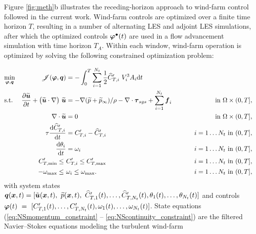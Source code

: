 \documentclass[a4paper]{jpconf}
\begin{document}
Figure \ref{fig:meth}b illustrates the receding-horizon approach to wind-farm control followed in the current work. Wind-farm controls
are optimized over a finite time horizon $T$, resulting in a number of alternating LES and adjoint LES simulations, after which the
optimized controls $\boldsymbol{\varphi}^{\bullet}(t)$ are used in a flow advancement simulation with time horizon $T_A$. Within each window, wind-farm
operation is optimized by solving the following constrained optimization problem:  

\begin{alignat}{4}
& \underset{\boldsymbol{\varphi}, \boldsymbol{q}}{\text{min}}  & \hspace*{25pt}  \mathscr{J}(\boldsymbol{\varphi}, \boldsymbol{q}) &= - \int_{0}^{T} \sum_{i=1}^{N_t} \frac{1}{2} \widehat{C}_{T,i}'~V_i^3 A_i \text{d}t  & \label{eq:costfunction}\\
& \text{s.t.}                      			&         \frac{\partial \widetilde{\boldsymbol{u}}}{\partial t} + \big(\widetilde{\boldsymbol{u}} \cdot \nabla \big)~ \widetilde{\boldsymbol{u}} &= - \nabla (\widetilde{p} + \widetilde{p}_\infty) / \rho - \nabla \cdot \boldsymbol{\tau}_{sgs} + \sum_{i=1}^{N_t} \boldsymbol{f}_i \hspace*{25pt}  & \text{in } \Omega \times (0,T], \label{eq:NSmomentum_constraint} \\
&                                                   &        \nabla \cdot \widetilde{\boldsymbol{u}}&=0 									        & \text{in } \Omega \times (0,T], \label{eq:NScontinuity_constraint}\\
&                                                   &        \tau \frac{\text{d} \widehat{C}_{T,i}'}{\text{d} t}&=C_{T,i}' - \widehat{C}_{T,i}' 								& i=1\dots N_t~\text{in } (0,T],  \label{eq:ctihat_constraint}\\
&                                                   &        \frac{\text{d} \theta_i}{\text{d} t}&=\omega_i											& i=1\dots N_t~\text{in } (0,T],  \label{eq:omega_constraint}\\
&                                                   &        C_{T,\text{min}}' \leq~ &C_{T,i}' \leq C_{T,\text{max}}'				& i=1\dots N_t~\text{in } (0,T],  \label{eq:boxct_constraint}\\
&                                                   &        -\omega_{\text{max}} \leq~ &\omega_i \leq \omega_{\text{max}}.   	& i=1\dots N_t~\text{in } (0,T],  \label{eq:boxomega_constraint}
\end{alignat}
with system states $\bolds{q}(\bolds{x},t) = [\ufilt(\bolds{x},t),\ \ptilde(\bolds{x},t),\ \ctnhat{1}(t), \dots, \ctnhat{N_t}(t), \theta_1(t), \dots,
\theta_{N_t}(t)]$ and controls $\boldsymbol{\varphi}(t)~=~[C_{T,1}'(t), \dots, C_{T,N_t}'(t), \omega_1(t), \dots, \omega_{N_t}(t)]$. State equations
(\ref{eq:NSmomentum_constraint} -- \ref{eq:NScontinuity_constraint}) are the filtered Navier--Stokes equations modeling the turbulent wind-farm
\end{document}
